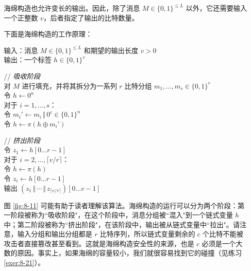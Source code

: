 海绵构造也允许变长的输出。因此，除了消息 $M\in\{0,1\}^{\leq L}$ 以外，它还需要输入一个正整数 $v$，后者指定了输出的比特数量。

下面是海绵构造的工作原理：

\vspace{5pt}

\hspace*{5pt} 输入：消息 $M\in\{0,1\}^{\leq L}$ 和期望的输出长度 $v>0$\\
\hspace*{26pt} 输出：一个标签 $h\in\{0,1\}^v$

\vspace{5pt}

\hspace*{5pt} // \emph{吸收阶段}\\
\hspace*{26pt} 对 $M$ 进行填充，并将其拆分为一系列 $r$ 比特分组 $m_1,\dots,m_s\in\{0,1\}^r$\\
\hspace*{26pt} 令 $h\leftarrow 0^n$\\
\hspace*{26pt} 对于 $i=1,\dots,s$：\\
\hspace*{50pt} 令 $m_i'\leftarrow m_i\,\Vert\,0^c\in\{0,1\}^n$\\
\hspace*{50pt} 令 $h\leftarrow\pi(h\oplus m_i')$

\vspace{5pt}

\hspace*{5pt} // \emph{挤出阶段}\\
\hspace*{26pt} 令 $z_1\leftarrow h[0\dots r-1]$\\
\hspace*{26pt} 对于 $i=2,\dots,\lceil v/r\rceil$：\\
\hspace*{50pt} 令 $h\leftarrow\pi(h)$\\
\hspace*{50pt} 令 $z_i\leftarrow h[0\dots r-1]$\\
\hspace*{26pt} 输出 $\left(z_1\,\Vert\,\cdots\,\Vert\,z_{\lceil v/r\rceil}\right)[0\dots v-1]$

\vspace{5pt}
图 \ref{fig:8-11} 可能有助于读者理解该算法。海绵构造的运行可以分为两个阶段：第一阶段被称为``吸收阶段"，在这个阶段中，消息分组被``混入"到一个链式变量 $h$ 中；第二阶段被称为``挤出阶段"，在该阶段中，输出被从链式变量中``拉出"。请注意，输入分组和输出分组都是 $r$ 比特序列，所以链式变量剩余的 $c$ 个比特不能被攻击者直接篡改甚至看到。这就是海绵构造安全性的来源，也是 $c$ 必须是一个大数的原因。事实上，如果海绵的容量较小，我们就很容易找到它的碰撞（见练习 \ref{exer:8-21}）。

